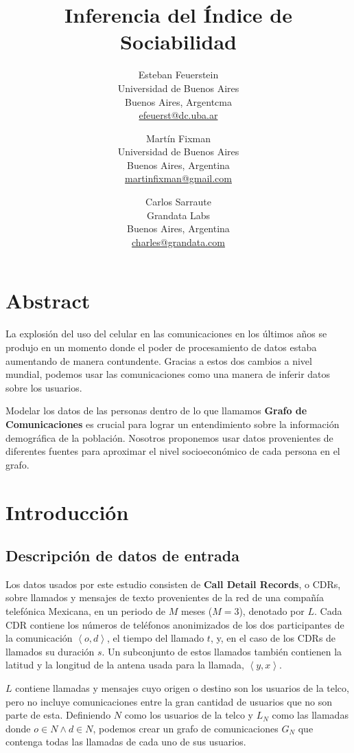 \documentclass[
10pt,
spanish,
singlespacing, %
parskip, %
headsepline, %
twocolumn
]{article} %
\title{Inferencia del Índice de Sociabilidad}
\author{
	\hspace{-1.725cm} Esteban Feuerstein\\
	\hspace{-1.725cm} Universidad de Buenos Aires\\
	\hspace{-1.725cm} Buenos Aires, Argentcma\\
	\hspace{-1.725cm} \url{efeuerst@dc.uba.ar}
	\and
	Martín Fixman\\
	Universidad de Buenos Aires\\
	Buenos Aires, Argentina\\
	\url{martinfixman@gmail.com}
	\and
	Carlos Sarraute\\
	Grandata Labs\\
	Buenos Aires, Argentina\\
	\url{charles@grandata.com}
}
\date{}
\begin{document}
\maketitle

\section*{Abstract}

La explosi\'on del uso del celular en las comunicaciones en los \'ultimos a\~nos se produjo en un momento donde el poder de procesamiento de datos estaba aumentando de manera contundente. Gracias a estos dos cambios a nivel mundial, podemos usar las comunicaciones como una manera de inferir datos sobre los usuarios.

Modelar los datos de las personas dentro de lo que llamamos \textbf{Grafo de Comunicaciones} es crucial para lograr un entendimiento sobre la informaci\'on demogr\'afica de la poblaci\'on. Nosotros proponemos usar datos provenientes de diferentes fuentes para aproximar el nivel socioecon\'omico de cada persona en el grafo.

\section*{Introducci\'on}


\subsection*{Descripci\'on de datos de entrada}

Los datos usados por este estudio consisten de \textbf{Call Detail Records}, o CDRs, sobre llamados y mensajes de texto provenientes de la red de una compa\~n\'ia telef\'onica Mexicana, en un periodo de \( M \) meses (\( M = 3 \)), denotado por \( L \). Cada CDR contiene los n\'umeros de tel\'efonos anonimizados de los dos participantes de la comunicaci\'on \(\left<o, d\right>\), el tiempo del llamado \(t\), y, en el caso de los CDRs de llamados su duraci\'on \(s\). Un subconjunto de estos llamados tambi\'en contienen la latitud y la longitud de la antena usada para la llamada, \(\left<y, x\right>\).

\( L \) contiene llamadas y mensajes cuyo origen o destino son los usuarios de la telco, pero no incluye comunicaciones entre la gran cantidad de usuarios que no son parte de esta. Definiendo \( N \) como los usuarios de la telco y \( L_N \) como las llamadas donde \( o \in N \wedge d \in N \), podemos crear un grafo de comunicaciones \( G_N \) que contenga todas las llamadas de cada uno de sus usuarios.
\end{document}
